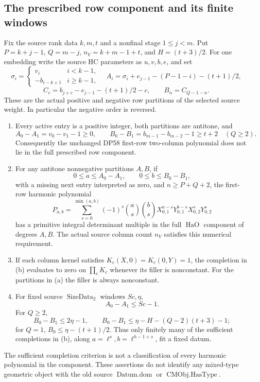 \subsection{The prescribed row component and its finite windows}

\begin{proposition}\label{DP61}
Fix the source rank data $k,m,t$ and a nonfinal stage $1\le j<m$.
Put $P=k+j-1$, $Q=m-j$, $n_V=k+m-1+t$, and $H=(t+3)/2$.
For one embedding write the source HC parameters as $u,v,b,e$, and set
\[
 \sigma_i=\begin{cases}v_i&i<k-1,\\-b_{i-k+1}&i\ge k-1,\end{cases}
 \quad A_i=\sigma_i+e_{j-1}-(P-1-i)-(t+1)/2,
\]
\[
 C_c=b_{j+c}-e_{j-1}-(t+1)/2-c,\qquad B_n=C_{Q-1-n}.
\]
These are the actual positive and negative row partitions of the selected
source weight. In particular the negative order is reversed.
\begin{enumerate}[label=(\alph*),leftmargin=*]
\item Every active entry is a positive integer, both partitions are
antitone, and
\[
 A_0-A_1=v_0-v_1-1\ge0,
 \qquad B_0-B_1=b_{m-1}-b_{m-2}-1\ge t+2\quad(Q\ge2).
\]
Consequently the unchanged DP58 first-row two-column polynomial does not
lie in the full prescribed row component.
\item For any antitone nonnegative partitions $A,B$, if
\[
 0\le a\le A_0-A_1,\qquad 0\le b\le B_0-B_1,
\]
with a missing next entry interpreted as zero, and $n\ge P+Q+2$, the
first-row harmonic polynomial
\[
 P_{a,b}=\sum_{s=0}^{\min(a,b)}(-1)^s\binom as\binom bs
 X_{0,1}^{a-s}Y_{0,1}^{b-s}X_{0,2}^sY_{0,2}^s
\]
has a primitive integral determinant multiple in the full
$\operatorname{HaO}$ component of degrees $A,B$.
The actual source column count $n_V$ satisfies this numerical requirement.
\item If each column kernel satisfies $K_c(X,0)=K_c(0,Y)=1$, the
completion in (b) evaluates to zero on $\prod_cK_c$ whenever its
filler is nonconstant. For the partitions in (a) the filler is always
nonconstant.
\item For fixed source $\operatorname{SizeData}_2$ windows $Sc,\eta$,
\[
 A_0-A_1\le Sc-1.
\]
For $Q\ge2$,
\[
 B_0-B_1\le2\eta-1,
 \qquad B_0-B_1\le\eta-H-(Q-2)(t+3)-1;
\]
for $Q=1$, $B_0\le\eta-(t+1)/2$.
Thus only finitely many of the sufficient completions in (b), along
$a=\ell^s,b=\ell^{h-1+s}$, fit a fixed datum.
\end{enumerate}
The sufficient completion criterion is not a classification of every
harmonic polynomial in the component. These assertions do not identify
any mixed-type geometric object with the old source
$\operatorname{Datum.dom}$ or $\operatorname{CMObj.HasType}$.
\end{proposition}


